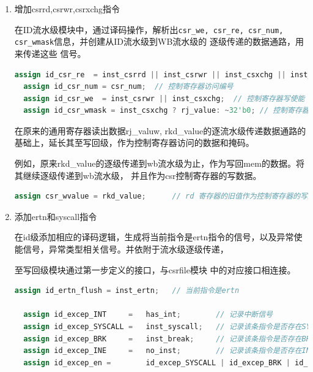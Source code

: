 \documentclass[11pt]{article}
\begin{document}
\begin{enumerate}
最后，在csrfile模块中创建了所有输入输出接口后，按照讲义上的内容，以每个CSR的各个域作为基本单位，
依次实现各个控制寄存器初始化，被指令访问和修改，被硬件电路逻辑访问和修改。

\item 增加csrrd,csrwr,csrxchg指令

在ID流水级模块中，通过译码操作，解析出\verb|csr_we, csr_re, csr_num, csr_wmask|信息，并创建从ID流水级到WB流水级的
逐级传递的数据通路，用来传递这些
信号。
\begin{lstlisting}[language=verilog]
  assign id_csr_re  = inst_csrrd || inst_csrwr || inst_csxchg || inst_ertn;   // 控制寄存器读使能
  assign id_csr_num = csr_num;  // 控制寄存器访问编号
  assign id_csr_we  = inst_csrwr || inst_csxchg;  // 控制寄存器写使能
  assign id_csr_wmask = inst_csxchg ? rj_value: ~32'b0; // 控制寄存器写掩码

\end{lstlisting}

在原来的通用寄存器读出数据rj\_valuw, rkd\_value的逐流水级传递数据通路的基础上，延长其至写回级，作为控制寄存器访问的数据和掩码。

例如，原来rkd\_value的逐级传递到wb流水级为止，作为写回mem的数据。将其继续逐级传递到wb流水级，
并且作为csr控制寄存器的写数据。
\begin{lstlisting}[language=verilog]
  assign csr_wvalue = rkd_value;      // rd 寄存器的旧值作为控制寄存器的写数据。
\end{lstlisting}



\item 添加ertn和syscall指令

在id级添加相应的译码逻辑，生成将当前指令是ertn指令的信号，以及异常使能信号，异常类型相关信号。并依附于流水级逐级传递，

至写回级模块通过第一步定义的接口，与csrfile模块
中的对应接口相连接。
\begin{lstlisting}[language=verilog]
  assign id_ertn_flush = inst_ertn;   // 当前指令是ertn

  assign id_excep_INT     =   has_int;        // 记录中断信号
  assign id_excep_SYSCALL =   inst_syscall;   // 记录该条指令是否存在SYSCALL异常
  assign id_excep_BRK     =   inst_break;     // 记录该条指令是否存在BRK异常
  assign id_excep_INE     =   no_inst;        // 记录该条指令是否存在INE异常
  assign id_excep_en =        id_excep_SYSCALL | id_excep_BRK | id_excep_INE | if_excep_en;         //只要有一个异常就置1
\end{lstlisting}


\end{enumerate}
\end{document}
